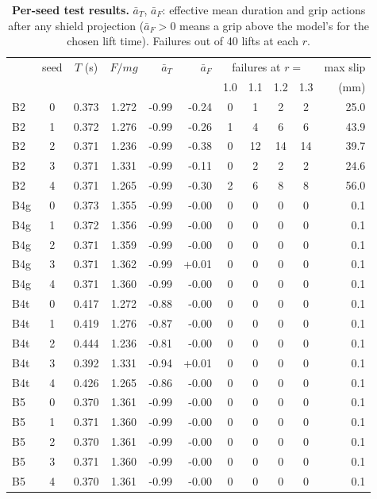 \begin{table}[!htbp]\centering\footnotesize
\caption{\textbf{Per-seed test results.} $\bar a_T$, $\bar a_F$: effective mean duration and grip actions after any shield
projection ($\bar a_F>0$ means a grip above the model's for the chosen lift time). Failures out of 40 lifts at each $r$.}\label{tab:perseed}
\setlength{\tabcolsep}{2.6pt}
\begin{tabular}{@{}lcccrrccccr@{}}\toprule
 & seed & $T$ (s) & $F/mg$ & $\bar a_T$ & $\bar a_F$ & \multicolumn{4}{c}{failures at $r=$} & max slip\\
 & & & & & & 1.0 & 1.1 & 1.2 & 1.3 & (mm)\\\midrule
B2 & 0 & 0.373 & 1.272 & -0.99 & -0.24 & 0 & 1 & 2 & 2 & 25.0 \\
B2 & 1 & 0.372 & 1.276 & -0.99 & -0.26 & 1 & 4 & 6 & 6 & 43.9 \\
B2 & 2 & 0.371 & 1.236 & -0.99 & -0.38 & 0 & 12 & 14 & 14 & 39.7 \\
B2 & 3 & 0.371 & 1.331 & -0.99 & -0.11 & 0 & 2 & 2 & 2 & 24.6 \\
B2 & 4 & 0.371 & 1.265 & -0.99 & -0.30 & 2 & 6 & 8 & 8 & 56.0 \\
\midrule
B4g & 0 & 0.373 & 1.355 & -0.99 & -0.00 & 0 & 0 & 0 & 0 & 0.1 \\
B4g & 1 & 0.372 & 1.356 & -0.99 & -0.00 & 0 & 0 & 0 & 0 & 0.1 \\
B4g & 2 & 0.371 & 1.359 & -0.99 & -0.00 & 0 & 0 & 0 & 0 & 0.1 \\
B4g & 3 & 0.371 & 1.362 & -0.99 & +0.01 & 0 & 0 & 0 & 0 & 0.1 \\
B4g & 4 & 0.371 & 1.360 & -0.99 & -0.00 & 0 & 0 & 0 & 0 & 0.1 \\
\midrule
B4t & 0 & 0.417 & 1.272 & -0.88 & -0.00 & 0 & 0 & 0 & 0 & 0.1 \\
B4t & 1 & 0.419 & 1.276 & -0.87 & -0.00 & 0 & 0 & 0 & 0 & 0.1 \\
B4t & 2 & 0.444 & 1.236 & -0.81 & -0.00 & 0 & 0 & 0 & 0 & 0.1 \\
B4t & 3 & 0.392 & 1.331 & -0.94 & +0.01 & 0 & 0 & 0 & 0 & 0.1 \\
B4t & 4 & 0.426 & 1.265 & -0.86 & -0.00 & 0 & 0 & 0 & 0 & 0.1 \\
\midrule
B5 & 0 & 0.370 & 1.361 & -0.99 & -0.00 & 0 & 0 & 0 & 0 & 0.1 \\
B5 & 1 & 0.371 & 1.360 & -0.99 & -0.00 & 0 & 0 & 0 & 0 & 0.1 \\
B5 & 2 & 0.370 & 1.361 & -0.99 & -0.00 & 0 & 0 & 0 & 0 & 0.1 \\
B5 & 3 & 0.371 & 1.360 & -0.99 & -0.00 & 0 & 0 & 0 & 0 & 0.1 \\
B5 & 4 & 0.370 & 1.361 & -0.99 & -0.00 & 0 & 0 & 0 & 0 & 0.1 \\
\bottomrule\end{tabular}\end{table}